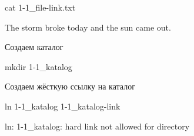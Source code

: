 \begin{BashBox}
    cat 1-1_file-link.txt
\end{BashBox}

\begin{OutBox}
    The storm broke today
    and the sun came out.
\end{OutBox}

Создаем каталог

\begin{BashBox}
    mkdir 1-1_katalog
\end{BashBox}

Создаем жёсткую ссылку на каталог

\begin{BashBox}
    ln 1-1_katalog 1-1_katalog-link
\end{BashBox}

\begin{OutBox}
    ln: 1-1_katalog: hard link not allowed for directory
\end{OutBox}

